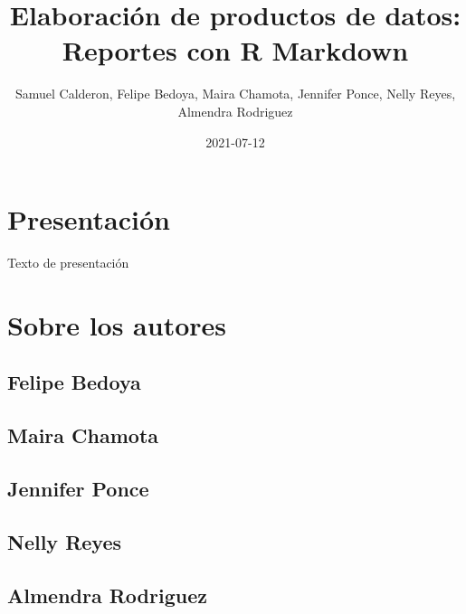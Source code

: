 \documentclass[
]{book}
\title{Elaboración de productos de datos: Reportes con R Markdown}
\author{Samuel Calderon, Felipe Bedoya, Maira Chamota, Jennifer Ponce, Nelly Reyes, Almendra Rodriguez}
\date{2021-07-12}
\begin{document}
\maketitle

{
\setcounter{tocdepth}{1}
\tableofcontents
}
\hypertarget{presentaciuxf3n}{%
\chapter*{Presentación}\label{presentaciuxf3n}}

Texto de presentación

\hypertarget{sobre-los-autores}{%
\chapter*{Sobre los autores}\label{sobre-los-autores}}

\hypertarget{felipe-bedoya}{%
\section*{Felipe Bedoya}\label{felipe-bedoya}}

\hypertarget{maira-chamota}{%
\section*{Maira Chamota}\label{maira-chamota}}

\hypertarget{jennifer-ponce}{%
\section*{Jennifer Ponce}\label{jennifer-ponce}}

\hypertarget{nelly-reyes}{%
\section*{Nelly Reyes}\label{nelly-reyes}}

\hypertarget{almendra-rodriguez}{%
\section*{Almendra Rodriguez}\label{almendra-rodriguez}}
\end{document}
